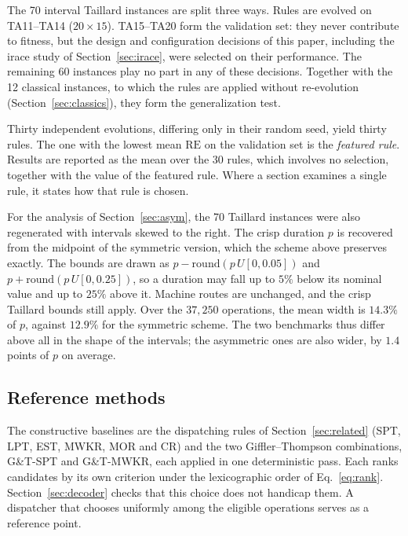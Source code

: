 \documentclass[review,authoryear,11pt]{elsarticle}
\newcommand{\RE}{\mathrm{RE}}
\begin{document}
The 70 interval Taillard instances are split three ways. Rules are
evolved on TA11--TA14 ($20{\times}15$). TA15--TA20 form the
validation set: they never contribute to fitness, but the design and
configuration decisions of this paper, including the irace study of
Section~\ref{sec:irace}, were selected on their performance. The
remaining 60 instances play no part in any of these decisions. Together
with the 12 classical instances, to which the rules are applied without
re-evolution (Section~\ref{sec:classics}), they form the generalization
test.

Thirty independent evolutions, differing only in their random seed,
yield thirty rules. The one with the lowest mean $\RE$ on the validation
set is the \emph{featured rule}. Results are reported as the mean over
the 30 rules, which involves no selection, together with the value of
the featured rule. Where a section examines a single rule, it states how
that rule is chosen.

For the analysis of Section~\ref{sec:asym}, the 70 Taillard instances
were also regenerated with intervals skewed to the right. The crisp
duration $p$ is recovered from the midpoint of the symmetric version,
which the scheme above preserves exactly. The bounds are drawn as
$p - \mathrm{round}(p\,U[0,0.05])$ and
$p + \mathrm{round}(p\,U[0,0.25])$, so a duration may fall up to $5\%$
below its nominal value and up to $25\%$ above it. Machine routes are
unchanged, and the crisp Taillard bounds still apply. Over the
$37{,}250$ operations, the mean width is $14.3\%$ of $p$, against
$12.9\%$ for the symmetric scheme. The two benchmarks thus differ above
all in the shape of the intervals; the asymmetric ones are also wider,
by $1.4$ points of $p$ on average.


\subsection{Reference methods}
\label{sec:reference}
The constructive baselines are the dispatching rules of
Section~\ref{sec:related} (SPT, LPT, EST, MWKR, MOR and CR) and the two
Giffler--Thompson combinations, G\&T-SPT and G\&T-MWKR, each applied in
one deterministic pass. Each ranks candidates by its own criterion under
the lexicographic order of Eq.~\eqref{eq:rank}.
Section~\ref{sec:decoder} checks that this choice does not handicap
them. A dispatcher that chooses uniformly
among the eligible operations serves as a reference point.
\end{document}
